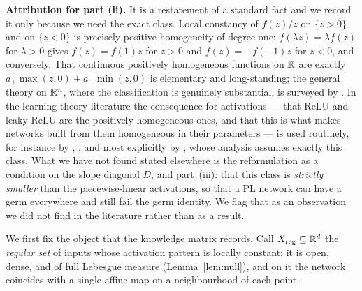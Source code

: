 \begin{clarifybox}
\textbf{Attribution for part (ii).} It is a restatement of a standard fact and
we record it only because we need the exact class. Local constancy of $f(z)/z$
on $\{z>0\}$ and on $\{z<0\}$ is precisely positive homogeneity of degree one:
$f(\lambda z)=\lambda f(z)$ for $\lambda>0$ gives $f(z)=f(1)z$ for $z>0$ and
$f(z)=-f(-1)z$ for $z<0$, and conversely. That continuous positively
homogeneous functions on $\mathbb{R}$ are exactly $a_+\max(z,0)+a_-\min(z,0)$ is
elementary and long-standing; the general theory on $\mathbb{R}^n$, where the
classification is genuinely substantial, is surveyed by
\citet{gorokhovik2016positively}. In the learning-theory literature the
consequence for activations --- that ReLU and leaky ReLU are the positively
homogeneous ones, and that this is what makes networks built from them
homogeneous in their parameters --- is used routinely, for instance by
\citet{neyshabur2015path}, \citet{dinh2017sharp}, and most explicitly by
\citet{lyu2020gradient}, whose analysis assumes exactly this class. What we
have not found stated elsewhere is the reformulation as a condition on the
slope diagonal $D$, and part~(iii): that this class is \emph{strictly smaller}
than the piecewise-linear activations, so that a PL network can have a germ
everywhere and still fail the germ identity. We flag that as an observation we
did not find in the literature rather than as a result.
\end{clarifybox}


We first fix the object that the knowledge matrix records. Call
$X_{\mathrm{reg}}\subseteq\mathbb{R}^d$ the \emph{regular set} of inputs whose
activation pattern is locally constant; it is open, dense, and of full
Lebesgue measure (Lemma~\ref{lem:null}), and on it the network coincides with a
single affine map on a neighbourhood of each point.

